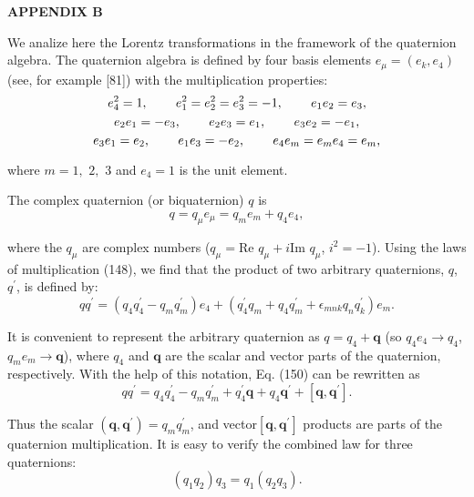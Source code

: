 \documentclass[a4paper,12pt]{article}
\begin{document}
\begin{center}
{\bf APPENDIX B}
\end{center}

We analize here the Lorentz transformations in the framework of
the quaternion algebra. The quaternion algebra is defined by four
basis elements $ e_\mu =(e_k,e_4)$ (see, for example [81]) with
the multiplication properties:
\[
e_4^2=1,\hspace{0.3in}e_1^2=e_2^2=e_3^2=-1,\hspace{0.3in}e_1e_2=e_3,
\]
\begin{equation}
e_2e_1=-e_3,\hspace{0.3in}e_2e_3=e_1,\hspace{0.3in}e_3e_2=-e_1,
\label{148}
\end{equation}
\[
e_3e_1=e_2,\hspace{0.3in}e_1e_3=-e_2,\hspace{0.3in}e_4e_m=e_me_4=e_m,
\]

where $m=1,$ $2,$ $3$ and $e_4=1$ is the unit element.

The complex quaternion (or biquaternion) $q$ is
\begin{equation}
q=q_\mu e_\mu =q_me_m+q_4e_4,  \label{149}
\end{equation}

where the $q_\mu $ are complex numbers ($q_\mu =$Re $q_\mu +i$Im
$q_\mu $, $ i^2=-1$). Using the laws of multiplication (148), we
find that the product of two arbitrary quaternions, $q$,
$q^{\prime }$, is defined by:
\begin{equation}
qq^{\prime }=\left( q_4q_4^{\prime }-q_mq_m^{\prime }\right)
e_4+\left( q_4^{\prime }q_m+q_4q_m^{\prime }+\epsilon
_{mnk}q_nq_k^{\prime }\right) e_m. \label{150}
\end{equation}

It is convenient to represent the arbitrary quaternion as
$q=q_4+\mathbf{q}$ (so $q_4e_4\rightarrow q_4$, $q_me_m\rightarrow
\mathbf{q}$), where $q_4$ and $\mathbf{q}$ are the scalar and
vector parts of the quaternion, respectively. With the help of
this notation, Eq. (150) can be rewritten as
\begin{equation}
qq^{\prime }=q_4q_4^{\prime }-q_mq_m^{\prime }+q_4^{\prime
}\mathbf{q}+q_4 \mathbf{q}^{\prime }+\left[
\mathbf{q},\mathbf{q}^{\prime }\right] . \label{151}
\end{equation}

Thus the scalar $\left( \mathbf{q},\mathbf{q}^{\prime }\right)
=q_mq_m^{\prime }$, and vector\thinspace $\left[
\mathbf{q},\mathbf{q} ^{\prime }\right] $ products are parts of
the quaternion multiplication. It is easy to verify the combined
law for three quaternions:
\begin{equation}
\left( q_1q_2\right) q_3=q_1\left( q_2q_3\right) .  \label{152}
\end{equation}
\end{document}
